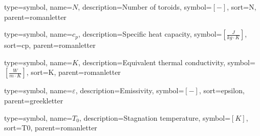{
	type=symbol, %
	name={\ensuremath{N}}, %
	description={Number of toroids}, %
	symbol={$\left[-\right]$}, %
	sort=N, %
	parent=romanletter %
}

{
	type=symbol, %
	name={\ensuremath{c_p}}, %
	description={Specific heat capacity}, %
	symbol={$\left[\frac{J}{kg\cdot K}\right]$}, %
	sort=cp, %
	parent=romanletter %
}

{
	type=symbol, %
	name={\ensuremath{K}}, %
	description={Equivalent thermal conductivity}, %
	symbol={$\left[\frac{W}{m\cdot K}\right]$}, %
	sort=K, %
	parent=romanletter %
}

{
	type=symbol, %
	name={\ensuremath{\varepsilon}}, %
	description={Emissivity}, %
	symbol={$\left[-\right]$}, %
	sort=epsilon, %
	parent=greekletter %
}

{
	type=symbol, %
	name={\ensuremath{T_0}}, %
	description={Stagnation temperature}, %
	symbol={$\left[K\right]$}, %
	sort=T0, %
	parent=romanletter %
}
	
